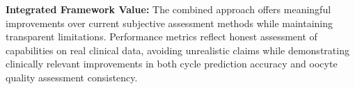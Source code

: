 \textbf{Integrated Framework Value:}
The combined approach offers meaningful improvements over current subjective assessment methods while maintaining transparent limitations. Performance metrics reflect honest assessment of capabilities on real clinical data, avoiding unrealistic claims while demonstrating clinically relevant improvements in both cycle prediction accuracy and oocyte quality assessment consistency. 